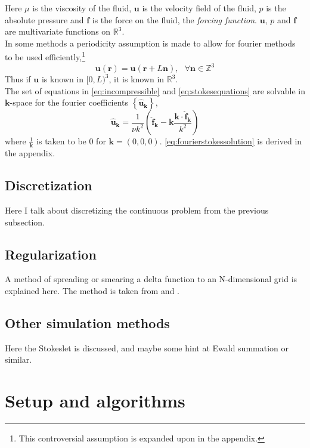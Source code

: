 \documentclass[a4paper,twoside=false,abstract=false,numbers=noenddot,
titlepage=false,headings=small,parskip=half,version=last]{scrartcl}
\begin{document}
Here $\mu$ is the viscosity of the fluid, $\mathbf{u}$ is the velocity field of the fluid, $p$ is the absolute pressure and $\mathbf{f}$ is the force on the fluid, the \emph{forcing function}. $\mathbf{u}$, $p$ and $\mathbf{f}$ are multivariate functions on $\mathbb{R}^3$.\\
In some methods a periodicity assumption is made to allow for fourier methods to be used efficiently,\footnote{This controversial assumption is expanded upon in the appendix.}
\begin{equation}
\mathbf{u}(\mathbf{r}) = \mathbf{u}(\mathbf{r}+L\mathbf{n}),\text{ }\forall \mathbf{n} \in \mathbb{Z}^3
\end{equation}
Thus if $\mathbf{u}$ is known in $[0,L)^3$, it is known in $\mathbb{R}^3$.\\
The set of equations in \eqref{eq:incompressible} and \eqref{eq:stokesequations} are solvable in $\mathbf{k}$-space for the fourier coefficients $\left\{\hat{\mathbf{u}}_\mathbf{k}\right\}$,
\begin{equation}
\hat{\mathbf{u}}_\mathbf{k} = \frac{1}{\nu k^2} \left( \hat{\mathbf{f}}_\mathbf{k} - \mathbf{k} \frac{\mathbf{k}\cdot \hat{\mathbf{f}}_\mathbf{k}}{k^2} \right) \label{eq:fourierstokessolution}
\end{equation}
where $\frac{1}{\mathbf{k}}$ is taken to be $0$ for $\mathbf{k}=(0,0,0)$. \eqref{eq:fourierstokessolution} is derived in the appendix.
\subsection{Discretization}
Here I talk about discretizing the continuous problem from the previous subsection.

\subsection{Regularization}
A method of spreading or smearing a delta function to an N-dimensional grid is explained here. The method is taken from \cite{spectralewald} and \cite{interfaceregularization}.

\subsection{Other simulation methods}
Here the Stokeslet is discussed, and maybe some hint at Ewald summation or similar.

\section{Setup and algorithms}
\end{document}
